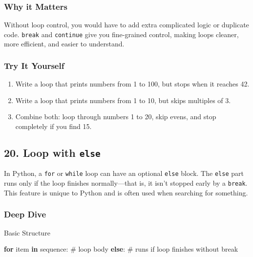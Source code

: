 \documentclass[
  letterpaper,
  DIV=11,
  numbers=noendperiod]{scrreprt}
\newenvironment{Shaded}{\begin{snugshade}}{\end{snugshade}}
\newcommand{\CommentTok}[1]{\textcolor[rgb]{0.37,0.37,0.37}{#1}}
\newcommand{\ControlFlowTok}[1]{\textcolor[rgb]{0.00,0.23,0.31}{\textbf{#1}}}
\newcommand{\KeywordTok}[1]{\textcolor[rgb]{0.00,0.23,0.31}{\textbf{#1}}}
\newcommand{\NormalTok}[1]{\textcolor[rgb]{0.00,0.23,0.31}{#1}}
\providecommand{\tightlist}{%
  \setlength{\itemsep}{0pt}\setlength{\parskip}{0pt}}
\begin{document}
\subsubsection{Why it Matters}\label{why-it-matters-19}

Without loop control, you would have to add extra complicated logic or
duplicate code. \texttt{break} and \texttt{continue} give you
fine-grained control, making loops cleaner, more efficient, and easier
to understand.

\subsubsection{Try It Yourself}\label{try-it-yourself-19}

\begin{enumerate}
\def\labelenumi{\arabic{enumi}.}
\tightlist
\item
  Write a loop that prints numbers from 1 to 100, but stops when it
  reaches 42.
\item
  Write a loop that prints numbers from 1 to 10, but skips multiples of
  3.
\item
  Combine both: loop through numbers 1 to 20, skip evens, and stop
  completely if you find 15.
\end{enumerate}

\subsection{\texorpdfstring{20. Loop with
\texttt{else}}{20. Loop with else}}\label{loop-with-else}

In Python, a \texttt{for} or \texttt{while} loop can have an optional
\texttt{else} block. The \texttt{else} part runs only if the loop
finishes normally---that is, it isn't stopped early by a \texttt{break}.
This feature is unique to Python and is often used when searching for
something.

\subsubsection{Deep Dive}\label{deep-dive-20}

Basic Structure

\begin{Shaded}
\begin{Highlighting}[]
\ControlFlowTok{for}\NormalTok{ item }\KeywordTok{in}\NormalTok{ sequence:}
    \CommentTok{\# loop body}
\ControlFlowTok{else}\NormalTok{:}
    \CommentTok{\# runs if loop finishes without break}
\end{Highlighting}
\end{Shaded}
\end{document}
